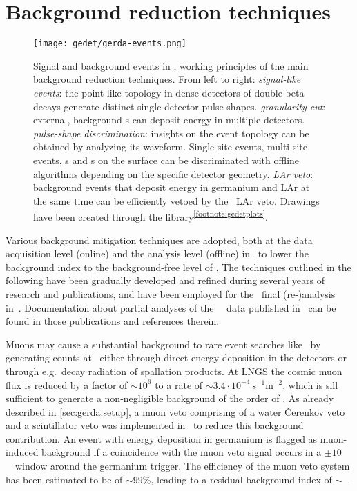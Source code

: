 \section{Background reduction techniques}%
\label{sec:gerda:cuts}

\begin{figure}
  \centering
  \texttt{[image: gedet/gerda-events.png]}
  \caption{%
    Signal and background events in \gerda, working principles of the main background
    reduction techniques. From left to right: \emph{signal-like events}: the point-like
    topology in dense detectors of double-beta decays generate distinct single-detector
    pulse shapes. \emph{granularity cut}: external, background \g{}s can deposit energy
    in multiple detectors. \emph{pulse-shape discrimination}: insights on the event
    topology can be obtained by analyzing its waveform. Single-site events, multi-site
    events, \b{}s and \a{}s on the surface can be discriminated with offline algorithms
    depending on the specific detector geometry. \emph{LAr veto}: background events that
    deposit energy in germanium and LAr at the same time can be efficiently vetoed by
    the \gerda\ LAr veto. Drawings have been
    created through the  library\textsuperscript{\ref{footnote:gedetplots}}.
  }\label{fig:gerda:event-types}
\end{figure}

Various background mitigation techniques are adopted, both at the data acquisition level
(online) and the analysis level (offline) in \gerda\ to lower the background index to the
background-free level of \pIIbi. The techniques outlined in the following have been
gradually developed and refined during several years of research and publications, and
have been employed for the \phasetwo\ final (re-)analysis in~\cite{Kermaidic2020, Agostini2021}.
Documentation about partial analyses of the \gerda\ \phasetwo\ data published
in~\cite{Agostini2015a, Agostini2017, Agostini2018, Agostini2019a} can be found in those
publications and references therein.

Muons may cause a substantial background to rare event searches like \gerda\ by generating
counts at \qbb\ either through direct energy deposition in the detectors or through
e.g.~decay radiation of spallation products. At LNGS the cosmic muon flux is reduced by a
factor of ${\sim}10^6$ to a rate of ${\sim}3.4 \cdot 10^{−4}~\text{s}^{-1}\text{m}^{-2}$,
which is sill sufficient to generate a non-negligible background of the order of
.  As already described in \cref{sec:gerda:setup}, a muon veto comprising of
a water \v{C}erenkov veto and a scintillator veto was implemented in \gerda\ to reduce
this background contribution. An event with energy deposition in germanium is flagged
as muon-induced background if a coincidence with the muon veto signal occurs in a $\pm
10$~\mus\ window around the germanium trigger. The efficiency of the muon veto system
has been estimated to be of ${\sim}99$\%, leading to a residual background index of
${\sim}$~\cite{Freund2016}.

